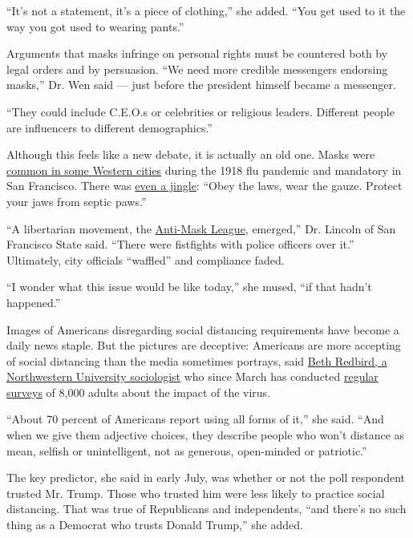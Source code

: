 ``It's not a statement, it's a piece of clothing,'' she added. ``You get
used to it the way you got used to wearing pants.''

Arguments that masks infringe on personal rights must be countered both
by legal orders and by persuasion. ``We need more credible messengers
endorsing masks,'' Dr. Wen said --- just before the president himself
became a messenger.

``They could include C.E.O.s or celebrities or religious leaders.
Different people are influencers to different demographics.''

Although this feels like a new debate, it is actually an old one. Masks
were
\href{https://www.history.com/news/1918-spanish-flu-mask-wearing-resistance}{common
in some Western cities} during the 1918 flu pandemic and mandatory in
San Francisco. There was
\href{https://www.pbs.org/wgbh/americanexperience/features/influenza-san-francisco/\#:~:text=One\%20of\%20the\%20more\%20highly,the\%20spread\%20of\%20flu\%20germs.\&text=A\%20Mask\%20is\%2099\%25\%20Proof,laws\%2C\%20and\%20wear\%20the\%20gauze.}{even
a jingle}: ``Obey the laws, wear the gauze. Protect your jaws from
septic paws.''

``A libertarian movement, the
\href{https://en.wikipedia.org/wiki/Anti-Mask_League_of_San_Francisco}{Anti-Mask
League}, emerged,'' Dr. Lincoln of San Francisco State said. ``There
were fistfights with police officers over it.'' Ultimately, city
officials ``waffled'' and compliance faded.

``I wonder what this issue would be like today,'' she mused, ``if that
hadn't happened.''

Images of Americans disregarding social distancing requirements have
become a daily news staple. But the pictures are deceptive: Americans
are more accepting of social distancing than the media sometimes
portrays, said
\href{https://magazine.northwestern.edu/exclusives/covid-19-impact-research/}{Beth
Redbird, a Northwestern University sociologist} who since March has
conducted \href{https://coronadata.us/data/}{regular surveys} of 8,000
adults about the impact of the virus.

``About 70 percent of Americans report using all forms of it,'' she
said. ``And when we give them adjective choices, they describe people
who won't distance as mean, selfish or unintelligent, not as generous,
open-minded or patriotic.''

The key predictor, she said in early July, was whether or not the poll
respondent trusted Mr. Trump. Those who trusted him were less likely to
practice social distancing. That was true of Republicans and
independents, ``and there's no such thing as a Democrat who trusts
Donald Trump,'' she added.

